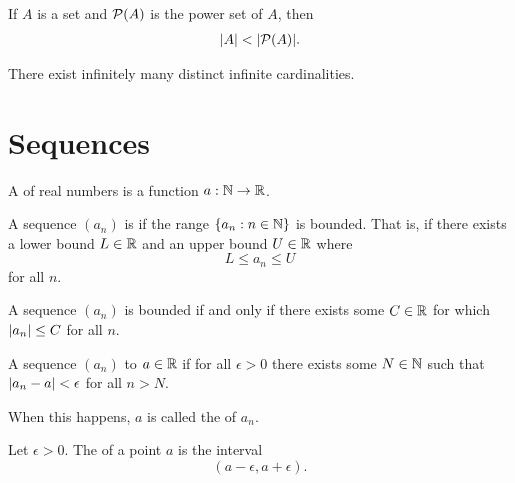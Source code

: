 \documentclass[11pt,twoside=off,numbers=noenddot]{scrbook}
\begin{document}
\begin{theorem}
    If $A$ is a set and $\mathcal{P}(A)$ is the power set of $A$, then
    \begin{align*}
        | A | < | \mathcal{P}(A) |.
    \end{align*}
\end{theorem}

\begin{corollary}
    There exist infinitely many distinct infinite cardinalities.
\end{corollary}

\chapter{Sequences}
\begin{definition}
    A  of real numbers is a function $a : \mathbb N \to \mathbb R$.
\end{definition}

\begin{definition}
    A sequence $(a_n)$ is  if the range $\{ a_n : n \in \mathbb N \}$ is bounded. That is, if there exists a lower bound $L \in \mathbb R$ and an upper bound $U \in \mathbb R$ where
    \[ L \leq a_n \leq U \]
    for all $n$.
\end{definition}

\begin{proposition}
    A sequence $(a_n)$ is bounded if and only if there exists some $C \in \mathbb R$ for which $| a_n | \leq C$ for all $n$.
\end{proposition}

\begin{definition}
    A sequence $(a_n)$  to $a \in \mathbb R$ if for all $\epsilon > 0$ there exists some $N \in \mathbb N$ such that $| a_n - a | < \epsilon$ for all $n > N$.

    When this happens, $a$ is called the  of $a_n$.
\end{definition}

\begin{definition}
    Let $\epsilon > 0$. The  of a point $a$ is the interval
    \[ (a - \epsilon, a + \epsilon). \]
\end{definition}
\end{document}
